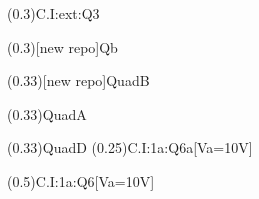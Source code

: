 \documentclass[a4paper,10pt]{article}
\begin{document}




\ftikzQuestion(0.3){C.I:ext:Q3}


\ftikzQuestion(0.3)[new repo]{Qb}


\tikzQuestion(0.33)[new repo]{QuadB}

\tikzQuestion(0.33){QuadA}

\tikzQuestion(0.33){QuadD}
\ftikzQuestion(0.25){C.I:1a:Q6a}[Va=10V]

\ftikzQuestion(0.5){C.I:1a:Q6}[Va=10V]
\newpage
\end{document}
